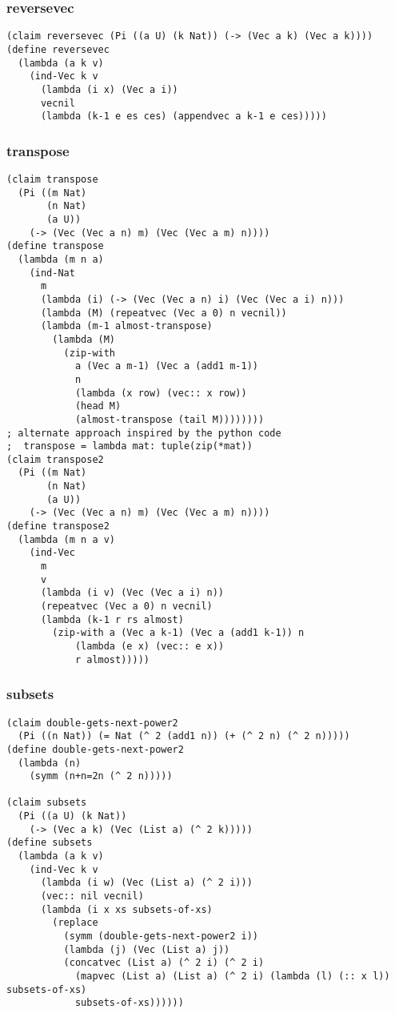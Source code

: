 \subsubsection{reversevec} \label{code:reversevec}
\begin{lstlisting}
(claim reversevec (Pi ((a U) (k Nat)) (-> (Vec a k) (Vec a k))))
(define reversevec
  (lambda (a k v)
    (ind-Vec k v
      (lambda (i x) (Vec a i))
      vecnil
      (lambda (k-1 e es ces) (appendvec a k-1 e ces)))))
\end{lstlisting}

\subsubsection{transpose} \label{code:transpose}
\begin{lstlisting}
(claim transpose
  (Pi ((m Nat)
       (n Nat)
       (a U))
    (-> (Vec (Vec a n) m) (Vec (Vec a m) n))))
(define transpose
  (lambda (m n a)
    (ind-Nat
      m
      (lambda (i) (-> (Vec (Vec a n) i) (Vec (Vec a i) n)))
      (lambda (M) (repeatvec (Vec a 0) n vecnil))
      (lambda (m-1 almost-transpose)
        (lambda (M)
          (zip-with
            a (Vec a m-1) (Vec a (add1 m-1))
            n
            (lambda (x row) (vec:: x row))
            (head M)
            (almost-transpose (tail M))))))))
; alternate approach inspired by the python code
;  transpose = lambda mat: tuple(zip(*mat))
(claim transpose2
  (Pi ((m Nat)
       (n Nat)
       (a U))
    (-> (Vec (Vec a n) m) (Vec (Vec a m) n))))
(define transpose2
  (lambda (m n a v)
    (ind-Vec
      m
      v
      (lambda (i v) (Vec (Vec a i) n))
      (repeatvec (Vec a 0) n vecnil)
      (lambda (k-1 r rs almost)
        (zip-with a (Vec a k-1) (Vec a (add1 k-1)) n 
            (lambda (e x) (vec:: e x)) 
            r almost)))))
\end{lstlisting}

\subsubsection{subsets} \label{code:subsets}
\begin{lstlisting}
(claim double-gets-next-power2
  (Pi ((n Nat)) (= Nat (^ 2 (add1 n)) (+ (^ 2 n) (^ 2 n)))))
(define double-gets-next-power2
  (lambda (n)
    (symm (n+n=2n (^ 2 n)))))

(claim subsets
  (Pi ((a U) (k Nat))
    (-> (Vec a k) (Vec (List a) (^ 2 k)))))
(define subsets
  (lambda (a k v)
    (ind-Vec k v
      (lambda (i w) (Vec (List a) (^ 2 i)))
      (vec:: nil vecnil)
      (lambda (i x xs subsets-of-xs)
        (replace
          (symm (double-gets-next-power2 i))
          (lambda (j) (Vec (List a) j))
          (concatvec (List a) (^ 2 i) (^ 2 i)
            (mapvec (List a) (List a) (^ 2 i) (lambda (l) (:: x l)) subsets-of-xs)
            subsets-of-xs))))))
\end{lstlisting}



